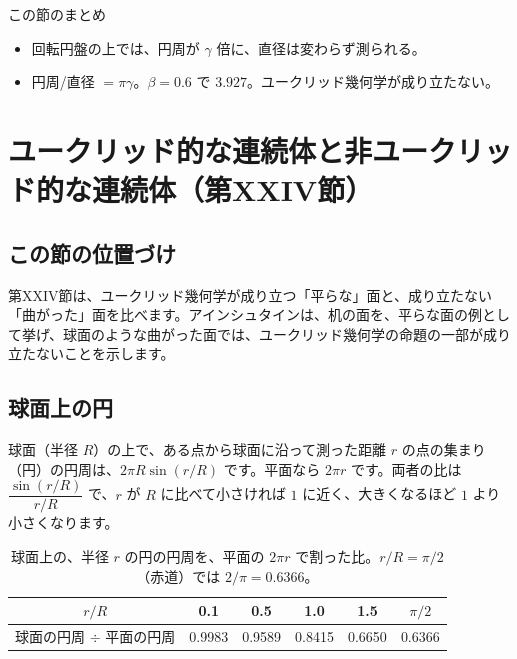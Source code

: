 \documentclass[a4paper,11pt,openany]{ltjsbook}
\begin{document}
\begin{pointbox}{この節のまとめ}
\begin{itemize}[leftmargin=*]
\item 回転円盤の上では、円周が $\gamma$ 倍に、直径は変わらず測られる。
\item 円周/直径 $=\pi\gamma$。$\beta=0.6$ で $3.927$。ユークリッド幾何学が成り立たない。
\end{itemize}
\end{pointbox}

\chapter{ユークリッド的な連続体と非ユークリッド的な連続体（第XXIV節）}

\section{この節の位置づけ}

第XXIV節は、ユークリッド幾何学が成り立つ「平らな」面と、成り立たない「曲がった」面を比べます。アインシュタインは、机の面を、平らな面の例として挙げ、球面のような曲がった面では、ユークリッド幾何学の命題の一部が成り立たないことを示します。

\section{球面上の円}

球面（半径 $R$）の上で、ある点から球面に沿って測った距離 $r$ の点の集まり（円）の円周は、$2\pi R\sin(r/R)$ です。平面なら $2\pi r$ です。両者の比は $\dfrac{\sin(r/R)}{r/R}$ で、$r$ が $R$ に比べて小さければ $1$ に近く、大きくなるほど $1$ より小さくなります。

\begin{table}[htbp]
\centering
\begin{tabular}{c|ccccc}
\toprule
$r/R$ & 0.1 & 0.5 & 1.0 & 1.5 & $\pi/2$\\
\midrule
球面の円周 $\div$ 平面の円周 & 0.9983 & 0.9589 & 0.8415 & 0.6650 & 0.6366\\
\bottomrule
\end{tabular}
\caption{球面上の、半径 $r$ の円の円周を、平面の $2\pi r$ で割った比。$r/R=\pi/2$（赤道）では $2/\pi=0.6366$。}
\end{table}
\end{document}
